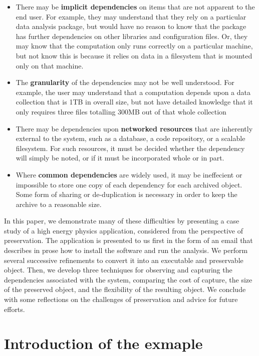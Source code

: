 \documentclass{acm_proc_article-sp}
\begin{document}
\begin{itemize}
\item There may be {\bf implicit dependencies} on items that are
not apparent to the end user.  For example, they may understand that
they rely on a particular data analysis package, but would have
no reason to know that the package has further dependencies on
other libraries and configuration files.  Or, they may know that
the computation only runs correctly on a particular machine, but
not know this is because it relies on data in a filesystem that
is mounted only on that machine.

\item The {\bf granularity} of the dependencies may not be well understood.
For example, the user may understand that a computation depends upon
a data collection that is 1TB in overall size, but not have detailed
knowledge that it only requires three files totalling 300MB out of that
whole collection

\item There may be dependencies upon {\bf networked resources} that
are inherently external to the system, such as a database, a code
repository, or a scalable filesystem.  For such resources, it
must be decided whether the dependency will simply be noted, or if it
must be incorporated whole or in part.

\item Where {\bf common dependencies} are widely used, it may be ineffecient or
impossible to store one copy of each dependency for each archived object.
Some form of sharing or de-duplication is necessary in order to keep
the archive to a reasonable size.
\end{itemize}

In this paper, we demonstrate many of these difficulties by presenting
a case study of a high energy physics application, considered from
the perspective of preservation.  The application is presented to us
first in the form of an email that describes in prose how to install
the software and run the analysis.  We perform several successive
refinements to convert it into an executable and preservable object.
Then, we develop three techniques for observing and capturing the
dependencies associated with the system, comparing the cost of capture,
the size of the preserved object, and the flexibility of the resulting
object.  We conclude with some reflections on the challenges of preservation
and advice for future efforts.

\section{Introduction of the exmaple}
\end{document}
